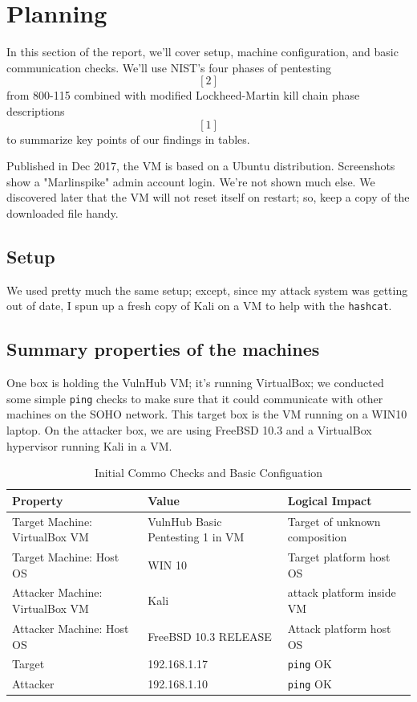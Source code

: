 \section{Planning}
In this section of the report, we'll cover setup, machine \gls{configuration}, and basic communication checks.  We'll use NIST's four phases of pentesting \[[2]\] from 800-115 combined with modified Lockheed-Martin kill chain phase descriptions \[[1]\] to summarize key points of our findings in tables.

Published in Dec 2017, the VM is based on a Ubuntu \gls{distribution}.  Screenshots show a "Marlinspike" admin account login.  We're not shown much else.  We discovered later that the VM will not reset itself on restart; so, keep a copy of the downloaded file handy.  

\subsection{Setup}

We used pretty much the same setup; except, since my \gls{attack} system was getting out of date, I spun up a fresh copy of Kali on a VM to help with the \texttt{hashcat}.

\subsection{Summary properties of the machines}
One box is holding the VulnHub VM; it's running VirtualBox; we conducted some simple  \texttt{ping} checks to make sure that it could communicate with other machines on the SOHO network.  This target box is the VM running on a WIN10 laptop.  On the attacker box, we are using FreeBSD 10.3 and a VirtualBox hypervisor running Kali in a VM.

\begin{table}[H]
\caption{Initial Commo Checks and Basic Configuation}
\centering
\begin{tabular}{|l|l|l|}
\hline
Property & Value & Logical Impact \\
\hline
Target Machine:  VirtualBox VM & VulnHub Basic Pentesting 1 in VM & Target of unknown composition \\
Target Machine:  Host OS & WIN 10 & Target platform host OS \\
Attacker Machine:  VirtualBox VM & Kali & \gls{attack} platform inside VM \\
Attacker Machine:  Host OS & FreeBSD 10.3 RELEASE & Attack\index{attack} platform host OS \\
Target & 192.168.1.17 & \texttt{ping} OK \\
Attacker & 192.168.1.10 & \texttt{ping} OK \\
\hline
\end{tabular}
\end{table}

